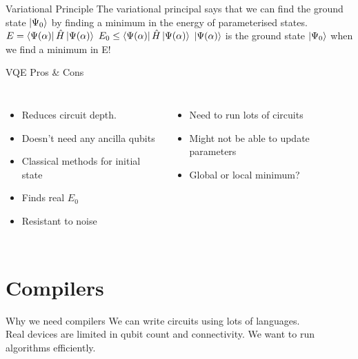 \documentclass{beamer}
\begin{document}
\begin{frame}{Variational Principle}
    The variational principal says that we can find the ground state $\ket{\Psi_0}$ by finding a minimum in the energy of parameterised states.\vfill
    \centering
    \begin{math}
        E = \bra{\Psi(\alpha)}\hat{H}\ket{\Psi(\alpha)}
    \end{math}
    \vfill
    \begin{math}
        E_0 \le \bra{\Psi(\alpha)}\hat{H}\ket{\Psi(\alpha)}
    \end{math}
    \vfill
    $\ket{\Psi(\alpha)}$ is the ground state $\ket{\Psi_0}$ when we find a minimum in E!
\end{frame}


\begin{frame}{VQE Pros \& Cons}
    \begin{columns}
        \begin{itemize}
            \item Reduces circuit depth.
            \item Doesn't need any ancilla qubits
            \item Classical methods for initial state
            \item Finds real $E_0$
            \item Resistant to noise
        \end{itemize}
        \begin{itemize}
            \pause
            \item Need to run lots of circuits
            \item Might not be able to update parameters
            \item Global or local minimum?
        \end{itemize}
    \end{columns}
\end{frame}

\section{Compilers}
\begin{frame}{Why we need compilers}
We can write circuits using lots of languages.\\\vfill
\pause
Real devices are limited in qubit count and connectivity.\vfill
\pause
We want to run algorithms efficiently.\vfill
\pause
\end{frame}
\end{document}
